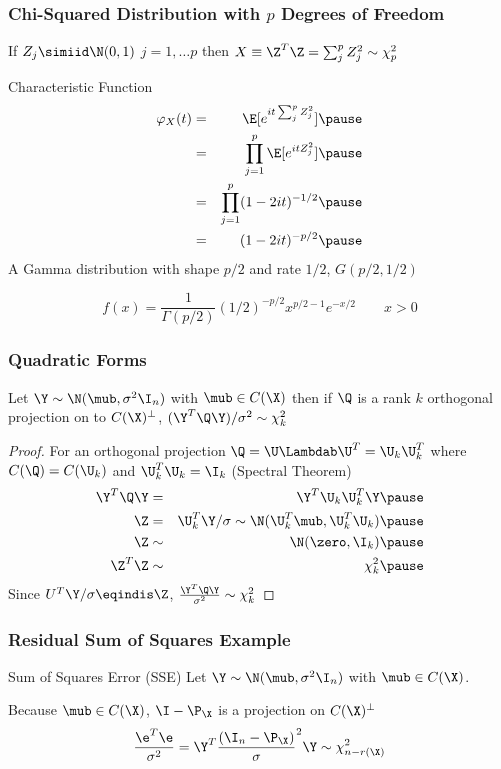 \documentclass{beamer}
\begin{document}
\begin{frame}
  \frametitle{Chi-Squared Distribution with $p$ Degrees of Freedom}
If $Z_j \simiid \N(0,1)$ $j = 1, \ldots p$ then $X \equiv \Z^T\Z = \sum_j^p
Z_j^2 \sim \chi^2_p$  \pause

\begin{block}{Characteristic Function}
\begin{eqnarray*}
  \varphi_{X}(t) & = & \E[e^{it \sum_j^p
Z_j^2}] \pause \\
& = & \prod_{j=1}^p \E[e^{it Z_j^2 }] \pause \\
& = &  \prod_{j=1}^p (1 - 2 i t)^{-1/2} \pause \\
& = & (1 - 2 i t)^{-p/2} \pause
\end{eqnarray*}
A  Gamma distribution with shape $p/2$ and rate $1/2$, $G(p/2, 1/2)$ 

$$
f(x) = \frac{1}{\Gamma(p/2)} (1/2)^{-p/2} x^{p/2 - 1} e^{-x/2} \qquad x
> 0
$$
 \end{block}
\end{frame}
\begin{frame}
  \frametitle{Quadratic Forms}
  \begin{theorem}
  Let  $\Y \sim  \N(\mub, \sigma^2 \I_n)$ with $\mub \in C(\X)$ then if $\Q$ is
  a rank $k$ orthogonal  projection on to $C(\X)^{\perp}$,
$(\Y^T \Q \Y)/\sigma^2 \sim \chi^2_k$
  \end{theorem}
  \begin{proof}
    For an orthogonal projection  $\Q = \U \Lambdab \U^T 
    = \U_k \U_k^T$ where $C(\Q) = C(\U_k)$ and $\U_k^T\U_k = \I_k$
    (Spectral Theorem) \pause
    \begin{eqnarray*}
\Y^T\Q \Y  &=& \Y^T\U_k \U_k^T \Y      \pause \\
\Z & =  &\U_k^T \Y/ \sigma  \sim \N(\U_k^T\mub, \U_k^T\U_k) \pause \\
\Z & \sim & \N(\zero, \I_k) \pause \\
\Z^T\Z & \sim & \chi^2_k \pause 
    \end{eqnarray*}
Since $U^T\Y /\sigma \eqindis \Z$, $\frac{\Y^T\Q \Y}{\sigma^2} \sim
\chi^2_k$


  \end{proof}
\end{frame}

\begin{frame} \frametitle{Residual Sum of Squares Example}
 
\begin{block}{Sum of Squares Error  (SSE)}
Let $\Y \sim \N(\mub, \sigma^2 \I_n)$ with $\mub \in C(\X)$.


Because $\mub \in C(\X)$, $\I - \P_{\X}$ is a projection on
$C(\X)^{\perp}$ \pause $$\frac{\e^T\e}{\sigma^2} = \Y^T\frac{(\I_n - \P_\X)}\sigma^2 \Y  \sim
 \chi^2_{n - r(\X)}$$ 
\end{block}
\end{frame}
\end{document}
